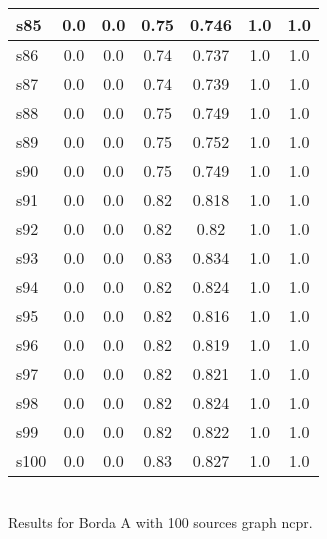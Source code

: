 \documentclass{article}
\begin{document}
\begin{tabular}{|l|c|c|c|c|c|c|}
\hline
s85 &0.0 & 0.0 & 0.75 & 0.746 & 1.0 & 1.0\\
\hline
s86 &0.0 & 0.0 & 0.74 & 0.737 & 1.0 & 1.0\\
\hline
s87 &0.0 & 0.0 & 0.74 & 0.739 & 1.0 & 1.0\\
\hline
s88 &0.0 & 0.0 & 0.75 & 0.749 & 1.0 & 1.0\\
\hline
s89 &0.0 & 0.0 & 0.75 & 0.752 & 1.0 & 1.0\\
\hline
s90 &0.0 & 0.0 & 0.75 & 0.749 & 1.0 & 1.0\\
\hline
s91 &0.0 & 0.0 & 0.82 & 0.818 & 1.0 & 1.0\\
\hline
s92 &0.0 & 0.0 & 0.82 & 0.82 & 1.0 & 1.0\\
\hline
s93 &0.0 & 0.0 & 0.83 & 0.834 & 1.0 & 1.0\\
\hline
s94 &0.0 & 0.0 & 0.82 & 0.824 & 1.0 & 1.0\\
\hline
s95 &0.0 & 0.0 & 0.82 & 0.816 & 1.0 & 1.0\\
\hline
s96 &0.0 & 0.0 & 0.82 & 0.819 & 1.0 & 1.0\\
\hline
s97 &0.0 & 0.0 & 0.82 & 0.821 & 1.0 & 1.0\\
\hline
s98 &0.0 & 0.0 & 0.82 & 0.824 & 1.0 & 1.0\\
\hline
s99 &0.0 & 0.0 & 0.82 & 0.822 & 1.0 & 1.0\\
\hline
s100 &0.0 & 0.0 & 0.83 & 0.827 & 1.0 & 1.0\\
\hline
\end{tabular}\\

\noindent Results for Borda A with 100 sources graph ncpr.
\end{document}
